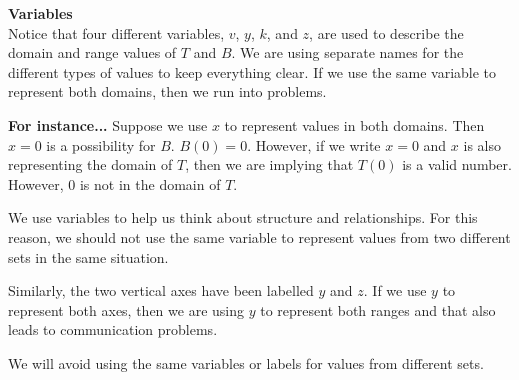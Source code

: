 \documentclass{ximera}
\begin{document}
\begin{warning} \textbf{\textcolor{red!80!black}{Variables}} \\

Notice that four different variables, $v$, $y$, $k$, and $z$, are used to describe the domain and range values of $T$ and $B$.  We are using separate names for the different types of values to keep everything clear. If we use the same variable to represent both domains, then we run into problems.




\textcolor{blue!55!black}{
\textbf{For instance...} Suppose we use $x$ to represent values in both domains.  Then $x = 0$ is a possibility for $B$.  $B(0) = 0$.  However, if we write $x = 0$ and $x$ is also representing the domain of $T$, then we are implying that $T(0)$ is a valid number.  However, $0$ is not in the domain of $T$.
}


We use variables to help us think about structure and relationships.  For this reason, we should not use the same variable to represent values from two different sets in the same situation.


Similarly, the two vertical axes have been labelled $y$ and $z$.  If we use $y$ to represent both axes, then we are using $y$ to represent both ranges and that also leads to communication problems.

We will avoid using the same variables or labels for values from different sets.

\end{warning}
\end{document}
